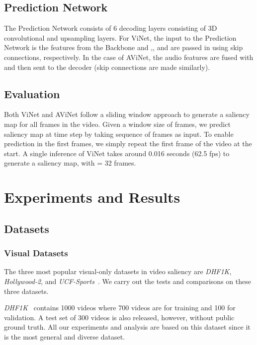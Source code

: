 \documentclass[letterpaper, 10 pt, conference]{ieeeconf}  \usepackage{times}
\begin{document}
\begin{table*}[t]
    \label{table:test_results}
\end{table*}





\subsection{Prediction Network}


The Prediction Network consists of 6 decoding layers consisting of 3D convolutional and upsampling layers. For ViNet, the input to the Prediction Network is the  features from the Backbone and ,, and  are passed in using skip connections, respectively. In the case of AViNet, the audio features are fused with  and then sent to the decoder (skip connections are made similarly). 




\subsection{Evaluation}
Both ViNet and AViNet follow a sliding window approach to generate a saliency map for all frames in the video. Given a window size of  frames, we predict saliency map  at time step  by taking  sequence of frames as input. To enable prediction in the first  frames, we simply repeat the first frame of the video at the start. A single inference of ViNet takes around 0.016 seconds (62.5 fps) to generate a saliency map, with  = 32 frames.






\section{Experiments and Results}
\subsection{Datasets}
\subsubsection{Visual Datasets}
The three most popular visual-only datasets in video saliency are \emph{DHF1K}, \emph{Hollywood-2}, and \emph{UCF-Sports}~\cite{rodriguez2008action}. We carry out the tests and comparisons on these three datasets. 

\emph{DHF1K}~\cite{wang2018revisiting} contains 1000 videos where 700 videos are for training and 100 for validation. A test set of 300 videos is also released, however, without public ground truth. All our experiments and analysis are based on this dataset since it is the most general and diverse dataset.
\end{document}
